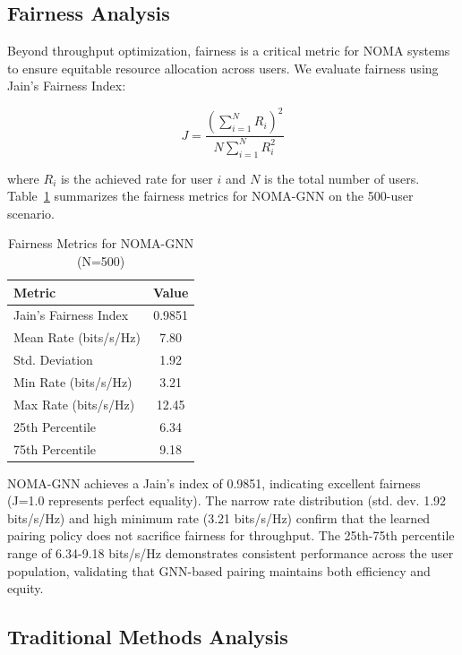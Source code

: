 \documentclass[conference]{IEEEtran}
\begin{document}
\subsection{Fairness Analysis}

Beyond throughput optimization, fairness is a critical metric for NOMA systems to ensure equitable resource allocation across users. We evaluate fairness using Jain's Fairness Index:

\begin{equation}
J = \frac{\left(\sum_{i=1}^{N} R_i\right)^2}{N \sum_{i=1}^{N} R_i^2}
\end{equation}

where $R_i$ is the achieved rate for user $i$ and $N$ is the total number of users. Table~\ref{tab:fairness} summarizes the fairness metrics for NOMA-GNN on the 500-user scenario.

\begin{table}[h]
\centering
\caption{Fairness Metrics for NOMA-GNN (N=500)}
\label{tab:fairness}
\begin{tabular}{l c}
\toprule
\textbf{Metric} & \textbf{Value} \\
\midrule
Jain's Fairness Index & 0.9851 \\
Mean Rate (bits/s/Hz) & 7.80 \\
Std. Deviation & 1.92 \\
Min Rate (bits/s/Hz) & 3.21 \\
Max Rate (bits/s/Hz) & 12.45 \\
25th Percentile & 6.34 \\
75th Percentile & 9.18 \\
\bottomrule
\end{tabular}
\end{table}

NOMA-GNN achieves a Jain's index of 0.9851, indicating excellent fairness (J=1.0 represents perfect equality). The narrow rate distribution (std. dev. 1.92 bits/s/Hz) and high minimum rate (3.21 bits/s/Hz) confirm that the learned pairing policy does not sacrifice fairness for throughput. The 25th-75th percentile range of 6.34-9.18 bits/s/Hz demonstrates consistent performance across the user population, validating that GNN-based pairing maintains both efficiency and equity.

\subsection{Traditional Methods Analysis}
\end{document}
